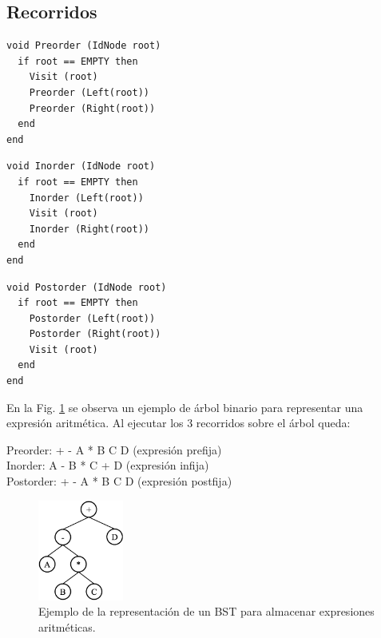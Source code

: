 \subsection{Recorridos}

\begin{lstlisting}[upquote=true, language=pseudo]
void Preorder (IdNode root)
  if root == EMPTY then
    Visit (root)
    Preorder (Left(root))
    Preorder (Right(root))
  end
end
\end{lstlisting}

\begin{lstlisting}[upquote=true, language=pseudo]
void Inorder (IdNode root)
  if root == EMPTY then
    Inorder (Left(root))
    Visit (root)
    Inorder (Right(root))
  end
end
\end{lstlisting}


\begin{lstlisting}[upquote=true, language=pseudo]
void Postorder (IdNode root)
  if root == EMPTY then
    Postorder (Left(root))
    Postorder (Right(root))
    Visit (root)
  end
end
\end{lstlisting}

En la Fig. \ref{fig:bintreeExpresion} se observa un ejemplo de árbol binario para representar una expresión aritmética. Al ejecutar los 3 recorridos sobre el árbol queda:

Preorder: + - A * B C D (expresión prefija) \\
Inorder: A - B * C + D (expresión infija) \\
Postorder: + - A * B C D (expresión postfija) \\

\begin{figure}[htpb!]
  \begin{center}
    \includegraphics[width=0.25\textwidth]{images/bintreeExpresion.eps}
  \end{center}
  \caption{Ejemplo de la representación de un BST para almacenar expresiones aritméticas.}
  \label{fig:bintreeExpresion}
\end{figure}



